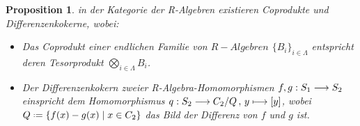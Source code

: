 \documentclass[10pt,a4paper]{report}
\newcounter{Aussage}[chapter]
\newtheorem{prop}[Aussage]{Proposition}
\newcommand{\functionfront}[3]{\nolinebreak{#1:#2 \longrightarrow #3}}
\newcommand{\function}[5]{\nolinebreak{#1:#2 \longrightarrow #3 \, , \, #4 \longmapsto #5}}
\newcommand*{\defeq}{\mathrel{\vcenter{\baselineskip0.5ex \lineskiplimit0pt
                     \hbox{\scriptsize.}\hbox{\scriptsize.}}}%
                     =}
\begin{document}
\begin{prop} \label{R-Algebra-Coprodukt,Differenzenkokern}
in der Kategorie der R-Algebren existieren Coprodukte und Differenzenkokerne, wobei:
\begin{itemize}
\item[\textbf{1.}] Das Coprodukt einer endlichen Familie von $R-Algebren$ $\lbrace B_i \rbrace_{i \in \Lambda}$ entspricht deren Tesorprodukt $\bigotimes_{i \in \Lambda} B_i$. 
\item[\textbf{2.}] Der Differenzenkokern zweier R-Algebra-Homomorphismen $\functionfront{f,g}{S_1}{S_2}$ einspricht dem Homomorphismus $\function{q}{S_2}{C_2/Q}{y}{[y]}$, wobei $Q \defeq \lbrace f(x) - g(x)\mid x \in C_2 \rbrace$ das Bild der Differenz von $f$ und $g$ ist.
\end{itemize}
\end{prop}
\end{document}
